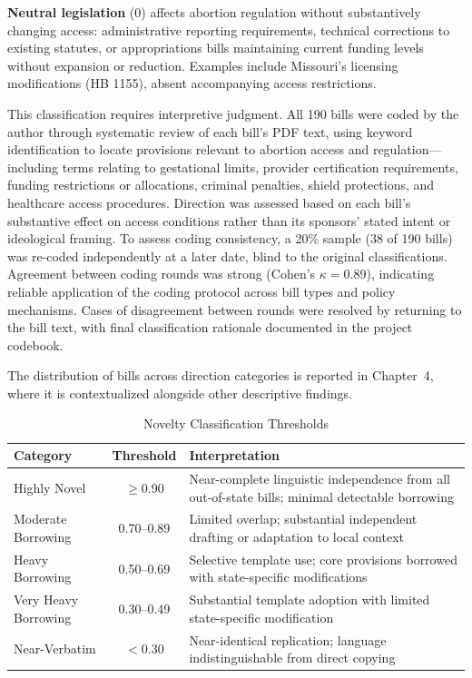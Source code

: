 \textbf{Neutral legislation} ($0$) affects abortion regulation without substantively changing access: administrative reporting requirements, technical corrections to existing statutes, or appropriations bills maintaining current funding levels without expansion or reduction. Examples include Missouri's licensing modifications (HB 1155), absent accompanying access restrictions.

This classification requires interpretive judgment. All 190 bills were coded by the author through systematic review of each bill's PDF text, using keyword identification to locate provisions relevant to abortion access and regulation---
including terms relating to gestational limits, provider certification requirements, funding restrictions or allocations, criminal penalties, shield protections, and healthcare access procedures. Direction was assessed based 
on each bill's substantive effect on access conditions rather than its sponsors' stated intent or ideological framing. To assess coding consistency, a 20\% sample (38 of 190 bills) was re-coded independently at a later date, blind to the 
original classifications. Agreement between coding rounds was strong (Cohen's $\kappa = 0.89$), indicating reliable application of the coding protocol across bill types and policy mechanisms. Cases of disagreement between rounds were 
resolved by returning to the bill text, with final classification rationale documented in the project codebook.

The distribution of bills across direction categories is reported in Chapter~4, where it is contextualized alongside other descriptive findings.

\begin{table}[h]
    \centering
    \caption{Novelty Classification Thresholds}
    \label{tab:novelty_thresholds}
    \begin{tabular}{lcp{6.5cm}}
    \toprule
    \textbf{Category} & \textbf{Threshold} & \textbf{Interpretation} \\
    \midrule
    Highly Novel & $\geq$0.90  & Near-complete linguistic independence from all out-of-state bills; minimal detectable borrowing \\
    Moderate Borrowing & 0.70--0.89  & Limited overlap; substantial independent drafting or adaptation to local context \\
    Heavy Borrowing & 0.50--0.69  & Selective template use; core provisions borrowed with state-specific modifications \\
    Very Heavy Borrowing & 0.30--0.49  & Substantial template adoption with limited state-specific modification \\
    Near-Verbatim & $<$0.30     & Near-identical replication; language indistinguishable from direct copying \\
    \bottomrule
    \end{tabular}
\end{table}

